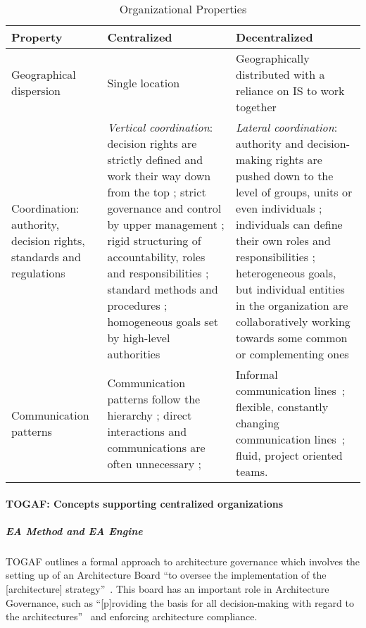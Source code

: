 \begin{table}
\caption{Organizational Properties}
\label{org_characteristics}
\begin{tabular}{ | p{} | p{}| p{} |}
%
\hline
%
\textbf{Property} & 
\textbf{Centralized} &
\textbf{Decentralized}  \\
%
\hline
%
Geographical dispersion \cite{luthans2006} & 
Single location &
Geographically distributed with a reliance on IS to work together \cite{applegate1988} \\
%
\hline
%
Coordination: authority, decision rights, standards and regulations & 
\textit{Vertical coordination}: decision rights are strictly defined and work their way down from the top \cite{Weill2004,pearlson2009}; strict governance and control by upper management \cite{pearlson2009,applegate1988}; rigid structuring of accountability, roles and responsibilities \cite{applegate1988}; standard methods and procedures \cite{mintzberg1981}; homogeneous goals set by high-level authorities \cite{Bolman2008} &
\textit{Lateral coordination}: authority and decision-making rights are pushed down to the level of groups, units or even individuals \cite{Weill2004,pearlson2009,robbins1997,Camarinha-Matos2005}; individuals can define their own roles and responsibilities \cite{valveHandbook}; heterogeneous goals, but individual entities in the organization are collaboratively working towards some common or complementing ones~\cite{Camarinha-Matos2005} \\
%
\hline
%
Communication patterns  & 
Communication patterns follow the hierarchy \cite{pearlson2009,applegate1988}; direct interactions and communications are often unnecessary \cite{thompson1967}; &
Informal communication lines~\cite{pearlson2009}; flexible, constantly changing communication lines~\cite{ahuja1998network}; fluid, project oriented teams.~\cite{applegate1988} \\
%
\hline
%
\end{tabular}
\end{table}



\paragraph*{TOGAF: Concepts supporting centralized organizations}

\subparagraph*{EA Method and EA Engine}
TOGAF outlines a formal approach to architecture governance which involves the setting up of an Architecture Board ``to oversee the implementation of the [architecture] strategy''~\cite[Ch. 47]{togaf9.1}. This board has an important role in Architecture Governance, such as ``[p]roviding the basis for all decision-making with regard to the architectures''~\cite[Ch. 47]{togaf9.1} and enforcing architecture compliance. 

